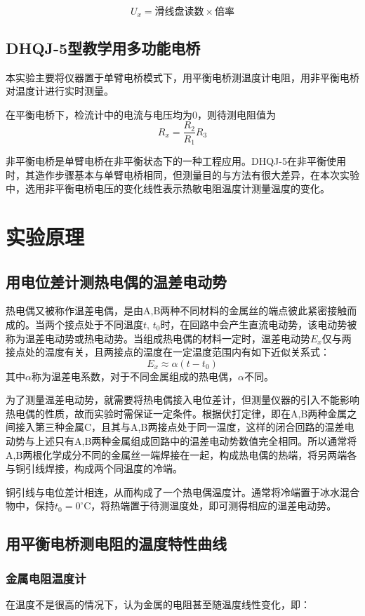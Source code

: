 \documentclass[12pt]{article}
\begin{document}
\[
    U_x=\text{滑线盘读数}\times\text{倍率}
\]

\subsection{DHQJ-5型教学用多功能电桥}
本实验主要将仪器置于单臂电桥模式下，用平衡电桥测温度计电阻，用非平衡电桥对温度计进行实时测量。

在平衡电桥下，检流计中的电流与电压均为0，则待测电阻值为
\[R_x=\frac{R_2}{R_1}R_3\]

非平衡电桥是单臂电桥在非平衡状态下的一种工程应用。DHQJ-5在非平衡使用时，其造作步骤基本与单臂电桥相同，但测量目的与方法有很大差异，在本次实验中，选用非平衡电桥电压的变化线性表示热敏电阻温度计测量温度的变化。

\section{实验原理}
\subsection{用电位差计测热电偶的温差电动势}
热电偶又被称作温差电偶，是由A,B两种不同材料的金属丝的端点彼此紧密接触而成的。当两个接点处于不同温度$ t,\,t_0 $时，在回路中会产生直流电动势，该电动势被称为温差电动势或热电动势。当组成热电偶的材料一定时，温差电动势$ E_x $仅与两接点处的温度有关，且两接点的温度在一定温度范围内有如下近似关系式：
\[E_x\approx\alpha(t-t_0)\]
其中$ \alpha $称为温差电系数，对于不同金属组成的热电偶，$ \alpha $不同。

为了测量温差电动势，就需要将热电偶接入电位差计，但测量仪器的引入不能影响热电偶的性质，故而实验时需保证一定条件。根据伏打定律，即在A,B两种金属之间接入第三种金属C，且其与A,B两接点处于同一温度，这样的闭合回路的温差电动势与上述只有A,B两种金属组成回路中的温差电动势数值完全相同。所以通常将A,B两根化学成分不同的金属丝一端焊接在一起，构成热电偶的热端，将另两端各与铜引线焊接，构成两个同温度的冷端。

铜引线与电位差计相连，从而构成了一个热电偶温度计。通常将冷端置于冰水混合物中，保持$ t_0=0^\circ\mathrm{C} $，将热端置于待测温度处，即可测得相应的温差电动势。

\subsection{用平衡电桥测电阻的温度特性曲线}
\subsubsection{金属电阻温度计}
在温度不是很高的情况下，认为金属的电阻甚至随温度线性变化，即：
\end{document}
